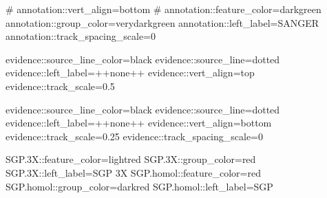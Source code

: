 \documentclass[11pt]{article}
\def\nwendcode{\endtrivlist \endgroup} %
\let\nwdocspar=\par                    %
\begin{document}
\nwenddocs{}\endmoddef
# annotation::vert_align=bottom
# annotation::feature_color=darkgreen
annotation::group_color=verydarkgreen
annotation::left_label=SANGER
annotation::track_spacing_scale=0
\nwendcode{}\nwdocspar

\nwenddocs{}\endmoddef
evidence::source_line_color=black
evidence::source_line=dotted
evidence::left_label=++none++
evidence::vert_align=top
evidence::track_scale=0.5
\nwendcode{}\nwdocspar

\nwenddocs{}\endmoddef
evidence::source_line_color=black
evidence::source_line=dotted
evidence::left_label=++none++
evidence::vert_align=bottom
evidence::track_scale=0.25
evidence::track_spacing_scale=0
\nwendcode{}\nwdocspar

\nwenddocs{}\endmoddef
SGP.3X::feature_color=lightred
SGP.3X::group_color=red
SGP.3X::left_label=SGP 3X
SGP.homol::feature_color=red
SGP.homol::group_color=darkred
SGP.homol::left_label=SGP
\nwendcode{}\nwdocspar
\end{document}
